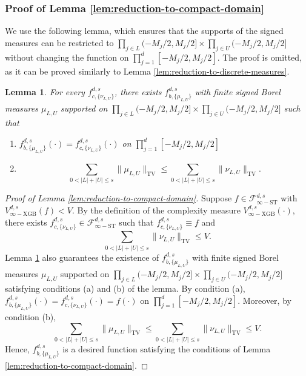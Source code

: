 \documentclass[10pt]{article}
\newtheorem{lemma}{Lemma}
\newcommand{\fstinf}{{\mathcal{F}^{d, s}_{\infty-\text{ST}}}}
\newcommand{\vinfxgb}{{V^{d, s}_{\infty-\text{XGB}}}}
\newcommand{\fcnu}{{f^{d, s}_{c, \{\nu_{L, U}\}}}}
\begin{document}
\subsubsection{Proof of Lemma \ref{lem:reduction-to-compact-domain}}
\label{pf:reduction-to-compact-domain}
We use the following lemma, which ensures that the supports of the 
signed measures can be restricted to 
$\prod_{j \in L} (-M_j/2, M_j/2] \times \prod_{j \in U} (-M_j/2, M_j/2]$ 
without changing the function on $\prod_{j = 1}^{d} [-M_j/2, M_j/2]$. 
The proof is omitted, as it can be proved similarly to 
Lemma \ref{lem:reduction-to-discrete-measures}.
\begin{lemma}\label{lem:reduction-to-compact-domain-2}
    For every $\fcnu$, there 
    exists $f^{d, s}_{b, \{\mu_{L, U}\}}$ with 
    finite signed Borel measures $\mu_{L, U}$ 
    supported on $\prod_{j \in L} (-M_j/2, M_j/2] 
    \times \prod_{j \in U} (-M_j/2, M_j/2]$ such that
    \begin{enumerate}[label = (\alph*)]
        \item $f^{d, s}_{b, \{\mu_{L, U}\}}(\cdot) 
        = \fcnu(\cdot)$ 
        on $\prod_{j = 1}^{d} [-M_j/2, M_j/2]$
        \item 
        \begin{equation*}
            \sum_{0 < |L| + |U| \le s}  
            \|\mu_{L, U}\|_{\text{TV}} 
            \le \sum_{0 < |L| + |U| \le s}  
            \|\nu_{L, U}\|_{\text{TV}}.
        \end{equation*}
    \end{enumerate}
\end{lemma}

\begin{proof}[Proof of Lemma \ref{lem:reduction-to-compact-domain}]
Suppose $f \in \fstinf$ with $\vinfxgb(f) < V$. By the definition of
the complexity measure $\vinfxgb(\cdot)$, there exists 
$\fcnu \in \fstinf$ such that $\fcnu \equiv f$ and 
\begin{equation*}
    \sum_{0 < |L| + |U| \le s}  
    \|\nu_{L, U}\|_{\text{TV}} \le V.
\end{equation*}
Lemma \ref{lem:reduction-to-compact-domain-2} also guarantees the 
existence of $f^{d, s}_{b, \{\mu_{L, U}\}}$ with finite signed Borel measures 
$\mu_{L, U}$ supported on $\prod_{j \in L} (-M_j/2, M_j/2] 
\times \prod_{j \in U} (-M_j/2, M_j/2]$ satisfying conditions (a) and (b) 
of the lemma.
By condition (a), $f^{d, s}_{b, \{\mu_{L, U}\}}(\cdot) 
= \fcnu(\cdot) = f(\cdot)$ on 
$\prod_{j = 1}^{d} [-M_j/2, M_j/2]$.
Moreover, by condition (b), 
\begin{equation*}
    \sum_{0 < |L| + |U| \le s}  
    \|\mu_{L, U}\|_{\text{TV}} \le 
    \sum_{0 < |L| + |U| \le s}  
    \|\nu_{L, U}\|_{\text{TV}} \le V.
\end{equation*}
Hence, $f^{d, s}_{b, \{\mu_{L, U}\}}$ is a desired function satisfying 
the conditions of Lemma \ref{lem:reduction-to-compact-domain}.
\end{proof}
\end{document}
